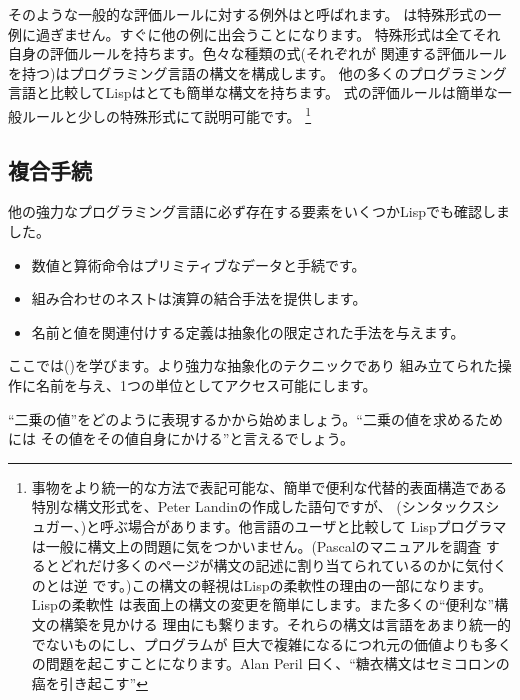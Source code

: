 そのような一般的な評価ルールに対する例外はと呼ばれます。
は特殊形式の一例に過ぎません。すぐに他の例に出会うことになります。
特殊形式は全てそれ自身の評価ルールを持ちます。色々な種類の式(それぞれが
関連する評価ルールを持つ)はプログラミング言語の構文を構成します。
他の多くのプログラミング言語と比較してLispはとても簡単な構文を持ちます。
式の評価ルールは簡単な一般ルールと少しの特殊形式にて説明可能です。
\footnote{事物をより統一的な方法で表記可能な、簡単で便利な代替的表面構造である
特別な構文形式を、Peter Landinの作成した語句ですが、
(シンタックスシュガー、)と呼ぶ場合があります。他言語のユーザと比較して
Lispプログラマは一般に構文上の問題に気をつかいません。(Pascalのマニュアルを調査
するとどれだけ多くのページが構文の記述に割り当てられているのかに気付くのとは逆
です。)この構文の軽視はLispの柔軟性の理由の一部になります。Lispの柔軟性
は表面上の構文の変更を簡単にします。また多くの``便利な''構文の構築を見かける
理由にも繋ります。それらの構文は言語をあまり統一的でないものにし、プログラムが
巨大で複雑になるにつれ元の価値よりも多くの問題を起こすことになります。Alan Peril
曰く、``糖衣構文はセミコロンの癌を引き起こす''}



\subsection{複合手続}
\label{Section 1.1.4}
他の強力なプログラミング言語に必ず存在する要素をいくつかLispでも確認しました。

\begin{itemize}

\item
数値と算術命令はプリミティブなデータと手続です。

\item
組み合わせのネストは演算の結合手法を提供します。

\item
名前と値を関連付けする定義は抽象化の限定された手法を与えます。

\end{itemize}

\noindent
ここでは()を学びます。より強力な抽象化のテクニックであり
組み立てられた操作に名前を与え、1つの単位としてアクセス可能にします。


``二乗の値''をどのように表現するかから始めましょう。``二乗の値を求めるためには
その値をその値自身にかける''と言えるでしょう。


